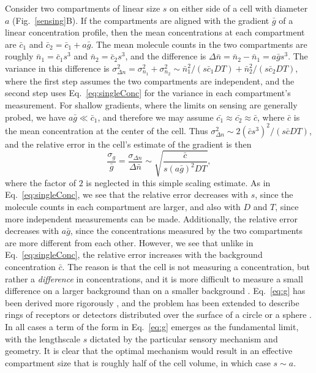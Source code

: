 Consider two compartments of linear size $s$ on either side of a cell with diameter $a$ (Fig.\ \ref{sensing}B). If the compartments are aligned with the gradient $\bar{g}$ of a linear concentration profile, then the mean concentrations at each compartment are $\bar{c}_1$ and
$\bar{c}_2 = \bar{c}_1 + a\bar{g}$.
The mean molecule counts in the two compartments are roughly $\bar{n}_1 = \bar{c}_1s^3$ and $\bar{n}_2 = \bar{c}_2s^3$, and the difference is $\Delta\bar{n} = \bar{n}_2 - \bar{n}_1 = a\bar{g}s^3$. The variance in this difference is
$\sigma_{\Delta n}^2 = \sigma_{n_1}^2 + \sigma_{n_2}^2 \sim \bar{n}_1^2/(s\bar{c}_1DT) + \bar{n}_2^2/(s\bar{c}_2DT)$,
where the first step assumes the two compartments are independent, and the second step uses Eq.\ \ref{eq:singleConc} for the variance in each compartment's measurement. For shallow gradients, where the limits on sensing are generally probed, we have $a\bar{g} \ll \bar{c}_1$, and therefore we may assume $\bar{c_1} \approx \bar{c_2} \approx \bar{c}$, where $\bar{c}$ is the mean concentration at the center of the cell. Thus
$\sigma_{\Delta n}^2 \sim 2(\bar{c}s^3)^2/(s\bar{c}DT)$,
and the relative error in the cell's estimate of the gradient is then
\begin{equation}
\label{eq:g}
\frac{\sigma_g}{\bar{g}} = \frac{\sigma_{\Delta n}}{\Delta \bar{n}} \sim \sqrt{\frac{\bar{c}}{s(a\bar{g})^2DT}},
\end{equation}
where the factor of $2$ is neglected in this simple scaling estimate. As in Eq.\ \ref{eq:singleConc}, we see that the relative error decreases with $s$, since the molecule counts in each compartment are larger, and also with $D$ and $T$, since more independent measurements can be made. Additionally, the relative error decreases with $a\bar{g}$, since the concentrations measured by the two compartments are more different from each other. However, we see that unlike in Eq.\ \ref{eq:singleConc}, the relative error increases with the background concentration $\bar{c}$. The reason is that the cell is not measuring a concentration, but rather a \textit{difference} in concentrations, and it is more difficult to measure a small difference on a larger background than on a smaller background \cite{ellison2016cell}. Eq.\ \ref{eq:g} has been derived more rigorously \cite{endres2009accuracy}, and the problem has been extended to describe rings of receptors \cite{endres2009accuracy} or detectors distributed over the surface of a circle \cite{hu2010physical} or a sphere \cite{endres2008accuracy}. In all cases a term of the form in Eq.\ \ref{eq:g} emerges as the fundamental limit, with the lengthscale $s$ dictated by the particular sensory mechanism and geometry. It is clear that the optimal mechanism would result in an effective compartment size that is roughly half of the cell volume, in which case $s\sim a$.

